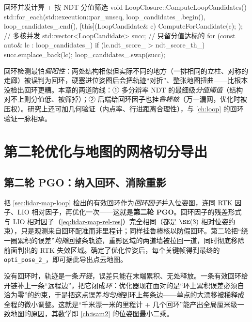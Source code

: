 \begin{codebox}[C++]{回环并发计算 + 按 NDT 分值筛选}
void LoopClosure::ComputeLoopCandidates() {
  std::for_each(std::execution::par_unseq, loop_candidates_.begin(), loop_candidates_.end(),
      [this](LoopCandidate& c) { ComputeForCandidate(c); });   // 多核并发
  std::vector<LoopCandidate> succ;                              // 只留分值达标的
  for (const auto& lc : loop_candidates_)
    if (lc.ndt_score_ > ndt_score_th_) succ.emplace_back(lc);
  loop_candidates_.swap(succ);
}
\end{codebox}

\begin{pitfall}[假回环比没回环更危险]
回环检测最怕\emph{假阳性}：两处结构相似但实际不同的地方（一排相同的立柱、对称的走廊）被误判为回环，硬塞进位姿图后会把轨迹“对折”、整张地图扭曲——比根本没检出回环更糟。本章的两道防线：① 多分辨率 NDT 的最细级\emph{分值阈值}（结构对不上则分值低、被筛掉）；② 后端给回环因子也挂\emph{鲁棒核}（万一漏网，优化时被压权）。研究上还可加几何验证（内点率、行进距离合理性），与 \cref{ch:loop} 的回环验证一脉相承。
\end{pitfall}

\section{第二轮优化与地图的网格切分导出}
\label{sec:lidar-map-export}

\subsection{第二轮 PGO：纳入回环、消除重影}
\label{sec:lidar-map-pgo2}

把 \cref{sec:lidar-map-loop} 检出的有效回环作为\emph{回环因子}并入位姿图，连同 RTK 因子、LIO 相对因子，再优化一次——这就是\textbf{第二轮 PGO}\cite{gao2023slamad}。回环因子的残差形式与 LIO 相对因子（\cref{eq:lidar-map-rel-res}）完全相同（都是 $\SE(3)$ 相对位姿约束），只是观测来自回环配准而非里程计；同样挂鲁棒核以防假回环。第二轮把“绕一圈累积的误差”\emph{均摊}回整条轨迹，重影区域的两道墙被拉回一道，同时彻底移除前面判出的 RTK 失效区域。确定了优化位姿后，每个关键帧得到最终的 \texttt{opti\_pose\_2\_}，即可据此导出点云地图。

\begin{insight}
没有回环时，轨迹是一条\emph{开链}，误差只能在末端累积、无处释放。一条有效回环给开链补上一条“远程边”，把它闭成\emph{环}：优化器现在面对的是“环上累积误差必须自洽为零”的约束，于是把这点误差\emph{均匀摊}到环上每条边——单点的大漂移被稀释成全程的微小调整。这就是“千米漂一米的里程计 + 几个回环”能产出全局厘米级一致地图的原因，其数学即 \cref{ch:isam2} 的位姿图最小二乘。
\end{insight}

